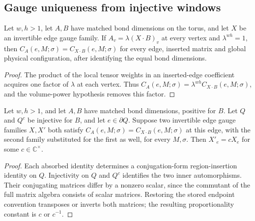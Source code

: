 \subsection{Gauge uniqueness from injective windows}
\label{subsec:peps_window_gauge_uniqueness}

\begin{lemma}%
    \label{thm:peps_edge_absorbed_from_local}
    \leanok
    Let $w,h>1$, let $A,B$ have matched bond dimensions on the torus,
    and let $X$ be an invertible edge gauge family. If
    $A_v=\lambda(X\cdot B)_v$ at every vertex and $\lambda^{wh}=1$, then
    $C_A(e,M;\sigma)=C_{X\cdot B}(e,M;\sigma)$ for every edge,
    inserted matrix and global physical configuration, after identifying
    the equal bond dimensions.
\end{lemma}
\begin{proof}\leanok
    The product of the local tensor weights in an inserted-edge coefficient
    acquires one factor of $\lambda$ at each vertex. Thus
    $C_A(e,M;\sigma)=\lambda^{wh}C_{X\cdot B}(e,M;\sigma)$, and the
    volume-power hypothesis removes this factor.
\end{proof}

\begin{lemma}%
    \label{thm:peps_absorbed_gauge_unique_region}
    \leanok
    Let $w,h>1$, and let $A,B$ have matched bond dimensions, positive for $B$.
    Let $Q$ and $Q^c$ be injective for $B$, and let $e\in\partial Q$.
    Suppose two invertible edge gauge families $X,X'$ both satisfy
    $C_A(e,M;\sigma)=C_{X\cdot B}(e,M;\sigma)$ at this edge, with the
    second family substituted for the first as well, for every $M,\sigma$.
    Then $X'_e=cX_e$ for some $c\in\mathbb C^\times$.
\end{lemma}
\begin{proof}\leanok
    Each absorbed identity determines a conjugation-form region-insertion
    identity on $Q$. Injectivity on $Q$ and $Q^c$ identifies the two inner
    automorphisms. Their conjugating matrices differ by a nonzero scalar,
    since the commutant of the full matrix algebra consists of scalar matrices.
    Restoring the stored endpoint convention transposes or inverts both
    matrices; the resulting proportionality constant is $c$ or $c^{-1}$.
\end{proof}


